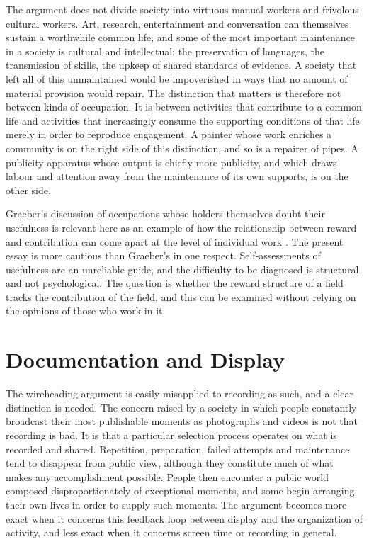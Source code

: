 \documentclass[11pt]{article}
\theoremstyle{definition}
\theoremstyle{remark}
\begin{document}
The argument does not divide society into virtuous manual workers and frivolous cultural workers. Art, research, entertainment and conversation can themselves sustain a worthwhile common life, and some of the most important maintenance in a society is cultural and intellectual: the preservation of languages, the transmission of skills, the upkeep of shared standards of evidence. A society that left all of this unmaintained would be impoverished in ways that no amount of material provision would repair. The distinction that matters is therefore not between kinds of occupation. It is between activities that contribute to a common life and activities that increasingly consume the supporting conditions of that life merely in order to reproduce engagement. A painter whose work enriches a community is on the right side of this distinction, and so is a repairer of pipes. A publicity apparatus whose output is chiefly more publicity, and which draws labour and attention away from the maintenance of its own supports, is on the other side.

Graeber's discussion of occupations whose holders themselves doubt their usefulness is relevant here as an example of how the relationship between reward and contribution can come apart at the level of individual work \cite{graeber2018}. The present essay is more cautious than Graeber's in one respect. Self-assessments of usefulness are an unreliable guide, and the difficulty to be diagnosed is structural and not psychological. The question is whether the reward structure of a field tracks the contribution of the field, and this can be examined without relying on the opinions of those who work in it.

\section{Documentation and Display}

The wireheading argument is easily misapplied to recording as such, and a clear distinction is needed. The concern raised by a society in which people constantly broadcast their most publishable moments as photographs and videos is not that recording is bad. It is that a particular selection process operates on what is recorded and shared. Repetition, preparation, failed attempts and maintenance tend to disappear from public view, although they constitute much of what makes any accomplishment possible. People then encounter a public world composed disproportionately of exceptional moments, and some begin arranging their own lives in order to supply such moments. The argument becomes more exact when it concerns this feedback loop between display and the organization of activity, and less exact when it concerns screen time or recording in general.
\end{document}
